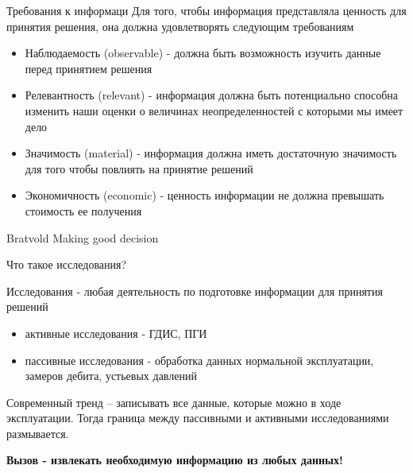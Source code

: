 \begin{frame}{Требования к информаци}
	Для того, чтобы информация представляла ценность для принятия решения, она должна удовлетворять следующим требованиям
	
	\begin{itemize}
		\item Наблюдаемость (observable) - должна быть возможность изучить данные перед принятием решения
		
		\item Релевантность (relevant) - информация должна быть потенциально способна изменить наши оценки о величинах неопределенностей с которыми мы имеет дело
		
		\item Значимость (material) - информация должна иметь достаточную значимость для того чтобы повлиять на принятие решений
		
		\item Экономичность (economic) - ценность информации не должна превышать стоимость ее получения
		
	\end{itemize}

Bratvold Making good decision 
	
\end{frame}

\begin{frame}{Что такое исследования?}

Исследования - любая деятельность по подготовке информации для принятия решений
\begin{itemize}
    \item активные исследования - ГДИС, ПГИ
    \item пассивные исследования - обработка данных нормальной эксплуатации, замеров дебита, устьевых давлений
\end{itemize}

Современный тренд -- записывать все данные, которые можно в ходе эксплуатации. Тогда граница между пассивными и активными исследованиями размывается.

\textbf{Вызов - извлекать необходимую информацию из любых данных!}
\end{frame}

